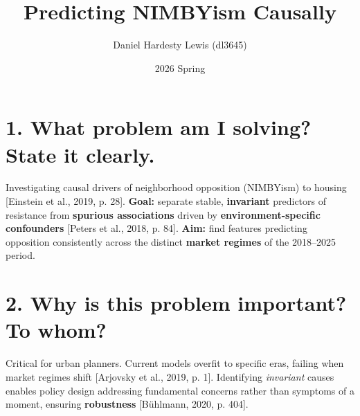 \documentclass[11pt]{article}
\title{\vspace{-2em}\textbf{Predicting NIMBYism Causally}}
\author{Daniel Hardesty Lewis (dl3645)\vspace{-1ex}}
\date{2026 Spring}
\begin{document}
\maketitle
\thispagestyle{fancy}
\vspace{-1em}

\section*{1. What problem am I solving? State it clearly.}
Investigating causal drivers of neighborhood opposition (NIMBYism) to housing [Einstein et al., 2019, p. 28]. \textbf{Goal:} separate stable, \textbf{invariant} predictors of resistance from \textbf{spurious associations} driven by \textbf{environment-specific confounders} [Peters et al., 2018, p. 84]. \textbf{Aim:} find features predicting opposition consistently across the distinct \textbf{market regimes} of the 2018--2025 period.

\section*{2. Why is this problem important? To whom?}
Critical for urban planners. Current models overfit to specific eras, failing when market regimes shift [Arjovsky et al., 2019, p. 1]. Identifying \textit{invariant} causes enables policy design addressing fundamental concerns rather than symptoms of a moment, ensuring \textbf{robustness} [Bühlmann, 2020, p. 404].
\end{document}
